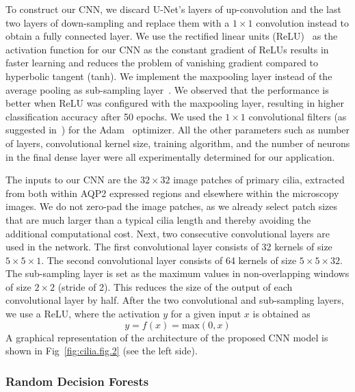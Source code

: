 To construct our CNN, we discard U-Net's layers of up-convolution and the last two layers of down-sampling and replace them with a $1 \times 1$ convolution instead to obtain a fully connected layer. We use the rectified linear units (ReLU)~\cite{ronneberger_UNet_2015} as the activation function for our CNN as the constant gradient of ReLUs results in faster learning and reduces the problem of vanishing gradient compared to hyperbolic tangent (tanh). We implement the maxpooling layer instead of the average pooling as sub-sampling layer~\cite{krizhevsky_Imagenet_2017}. We observed that the performance is better when ReLU was configured with the maxpooling layer, resulting in higher classification accuracy after 50 epochs. We used the $1 \times 1$ convolutional filters (as suggested in~\cite{gupta_Convolutional_2017}) for the Adam~\cite{kingma_Variational_2015} optimizer. All the other parameters such as number of layers, convolutional kernel size, training algorithm, and the number of neurons in the final dense layer were all experimentally determined for our application.

The inputs to our CNN are the $32 \times 32$ image patches of primary cilia, extracted from both within AQP2 expressed regions and elsewhere within the microscopy images. We do not zero-pad the image patches, as we already select patch sizes that are much larger than a typical cilia length and thereby avoiding the additional computational cost. Next, two consecutive convolutional layers are used in the network. The first convolutional layer consists of 32 kernels of size $5 \times 5 \times 1$. The second convolutional layer consists of 64 kernels of size $5 \times 5 \times 32$. The sub-sampling layer is set as the maximum values in non-overlapping windows of size $2 \times 2$ (stride of 2). This reduces the size of the output of each convolutional layer by half. After the two convolutional and sub-sampling layers, we use a ReLU, where the activation $y$ for a given input $x$ is obtained as
\begin{equation}
y = f(x) = \text{max}(0,x)
\label{eq:cilia.eq.1}
\end{equation}
A graphical representation of the architecture of the proposed CNN model is shown in Fig~\ref{fig:cilia.fig.2} (see the left side).

\subsubsection{\textbf{Random Decision Forests}}

